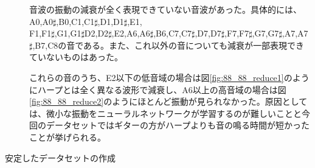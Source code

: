 \begin{description}
音波の振動の減衰が全く表現できていない音波があった。具体的には、A0,A0$\sharp$,B0,C1,C1$\sharp$,D1,D1$\sharp$,E1,\\
F1,F1$\sharp$,G1,G1$\sharp$D2,D2$\sharp$,E2,A6,A6$\sharp$,B6,C7,C7$\sharp$,D7,D7$\sharp$,F7,F7$\sharp$,G7,G7$\sharp$,A7,A7$\sharp$,B7,C8の音である。また、これ以外の音についても減衰が一部表現できていないものはあった。

これらの音のうち、E2以下の低音域の場合は図\ref{fig:88_88_reduce1}のようにハープとは全く異なる波形で減衰し、A6以上の高音域の場合は図\ref{fig:88_88_reduce2}のようにほとんど振動が見られなかった。原因としては、微小な振動をニューラルネットワークが学習するのが難しいことと今回のデータセットではギターの方がハープよりも音の鳴る時間が短かったことが挙げられる。


\item[安定したデータセットの作成]\mbox{}


\end{description}
